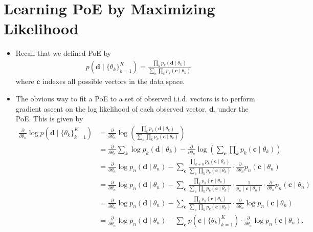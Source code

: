 \documentclass[10pt]{article}
\begin{document}
\newpage

\section{Learning PoE by Maximizing Likelihood}

\begin{itemize}
\item Recall that we defined PoE by
\begin{align}
p(\mathbf{d} \mid \{\theta_k\}_{k = 1}^K) = \frac{\prod_k p_k(\mathbf{d} \mid \theta_k)}{\sum_\mathbf{c} \prod_k p_k(\mathbf{c} \mid \theta_k)} \label{eq:1}
\end{align}
where $\mathbf{c}$ indexes all possible vectors in the data space.
\item The obvious way to fit a PoE to a set of observed i.i.d. vectors is to perform gradient ascent on the log likelihood of each observed vector, $\mathbf{d}$, under the PoE. This is given by
\begin{align}
\frac{\partial}{\partial \theta_n} \log p(\mathbf{d} \mid \{\theta_k\}_{k = 1}^K) &= \frac{\partial}{\partial \theta_n} \log\left( \frac{\prod_k p_k(\mathbf{d} \mid \theta_k)}{\sum_\mathbf{c} \prod_k p_k(\mathbf{c} \mid \theta_k)} \right) \nonumber \\
&= \frac{\partial}{\partial \theta_n} \sum_k \log p_k(\mathbf{d} \mid \theta_k) - \frac{\partial}{\partial \theta_n} \log\left( \sum_\mathbf{c} \prod_k p_k(\mathbf{c} \mid \theta_k) \right) \nonumber \\
&= \frac{\partial}{\partial \theta_n} \log p_n(\mathbf{d} \mid \theta_n) - \sum_\mathbf{c} \frac{\prod_{k \neq n} p_k(\mathbf{c} \mid \theta_k)}{\sum_\mathbf{c} \prod_k p_k(\mathbf{c} \mid \theta_k)} \cdot \frac{\partial}{\partial \theta_n} p_n(\mathbf{c} \mid \theta_n) \nonumber \\
&= \frac{\partial}{\partial \theta_n} \log p_n(\mathbf{d} \mid \theta_n) - \sum_\mathbf{c} \frac{\prod_k p_k(\mathbf{c} \mid \theta_k)}{\sum_\mathbf{c} \prod_k p_k(\mathbf{c} \mid \theta_k)} \cdot \frac{1}{p_n(\mathbf{c} \mid \theta_n)} \cdot \frac{\partial}{\partial \theta_n} p_n(\mathbf{c} \mid \theta_n) \nonumber \\
&= \frac{\partial}{\partial \theta_n} \log p_n(\mathbf{d} \mid \theta_n) - \sum_\mathbf{c} \frac{\prod_k p_k(\mathbf{c} \mid \theta_k)}{\sum_\mathbf{c} \prod_k p_k(\mathbf{c} \mid \theta_k)} \cdot \frac{\partial}{\partial \theta_n} \log p_n(\mathbf{c} \mid \theta_n) \nonumber \\
&= \frac{\partial}{\partial \theta_n} \log p_n(\mathbf{d} \mid \theta_n) - \sum_\mathbf{c} p(\mathbf{c} \mid \{\theta_k\}_{k = 1}^K) \cdot \frac{\partial}{\partial \theta_n} \log p_n(\mathbf{c} \mid \theta_n). \label{eq:2}

\end{align}
\end{itemize}
\end{document}
